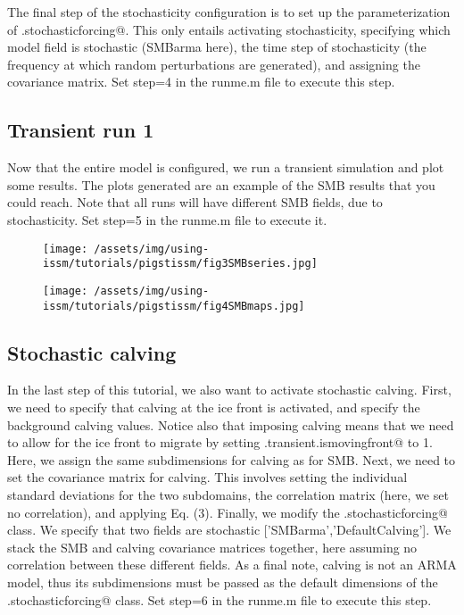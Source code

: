 The final step of the stochasticity configuration is to set up the parameterization of \verb@md.stochasticforcing@. This only entails activating stochasticity, specifying which model field is stochastic (SMBarma here), the time step of stochasticity (the frequency at which random perturbations are generated), and assigning the covariance matrix.
Set step=4 in the runme.m file to execute this step.

\subsection{Transient run 1}%
Now that the entire model is configured, we run a transient simulation and plot some results. The plots generated are an example of the SMB results that you could reach. Note that all runs will have different SMB fields, due to stochasticity. Set step=5 in the runme.m file to execute it.
\begin{figure}
	\begin{center}
		\texttt{[image: /assets/img/using-issm/tutorials/pigstissm/fig3SMBseries.jpg]}
	\end{center}
\end{figure}
\begin{figure}
	\begin{center}
		\texttt{[image: /assets/img/using-issm/tutorials/pigstissm/fig4SMBmaps.jpg]}
	\end{center}
\end{figure}

\subsection{Stochastic calving}%
In the last step of this tutorial, we also want to activate stochastic calving. First, we need to specify that calving at the ice front is activated, and specify the background calving values. Notice also that imposing calving means that we need to allow for the ice front to migrate by setting \verb@md.transient.ismovingfront@ to 1.
Here, we assign the same subdimensions for calving as for SMB. Next, we need to set the covariance matrix for calving. This involves setting the individual standard deviations for the two subdomains, the correlation matrix (here, we set no correlation), and applying Eq. (3). Finally, we modify the \verb@md.stochasticforcing@ class. We specify that two fields are stochastic [{'SMBarma'},{'DefaultCalving'}]. We stack the SMB and calving covariance matrices together, here assuming no correlation between these different fields. As a final note, calving is not an ARMA model, thus its subdimensions must be passed as the default dimensions of the \verb@md.stochasticforcing@ class.
Set step=6 in the runme.m file to execute this step.

